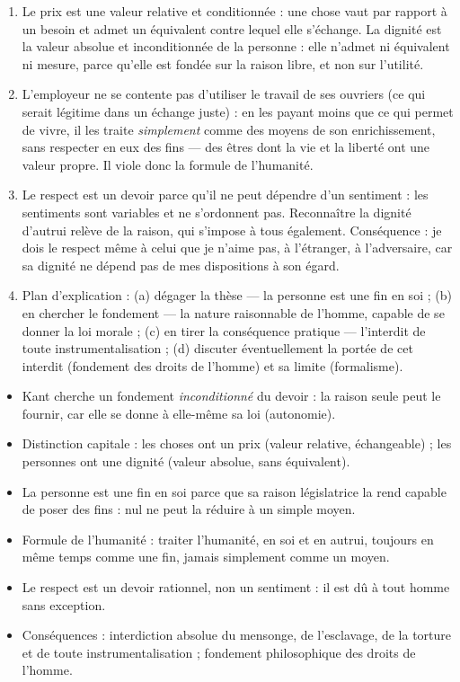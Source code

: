 \documentclass[11pt]{article}
\newcommand{\cle}[1]{{\popxbold\color{popdark}#1}}
\begin{document}
\begin{corrige}
\begin{enumerate}
\item Le prix est une valeur relative et conditionnée : une chose vaut par rapport à un besoin et admet un équivalent contre lequel elle s'échange. La dignité est la valeur absolue et inconditionnée de la personne : elle n'admet ni équivalent ni mesure, parce qu'elle est fondée sur la raison libre, et non sur l'utilité.
\item L'employeur ne se contente pas d'utiliser le travail de ses ouvriers (ce qui serait légitime dans un échange juste) : en les payant moins que ce qui permet de vivre, il les traite \emph{simplement} comme des moyens de son enrichissement, sans respecter en eux des fins — des êtres dont la vie et la liberté ont une valeur propre. Il viole donc la formule de l'humanité.
\item Le respect est un devoir parce qu'il ne peut dépendre d'un sentiment : les sentiments sont variables et ne s'ordonnent pas. Reconnaître la dignité d'autrui relève de la raison, qui s'impose à tous également. Conséquence : je dois le respect même à celui que je n'aime pas, à l'étranger, à l'adversaire, car sa dignité ne dépend pas de mes dispositions à son égard.
\item Plan d'explication : (a) dégager la thèse — la personne est une fin en soi ; (b) en chercher le fondement — la nature raisonnable de l'homme, capable de se donner la loi morale ; (c) en tirer la conséquence pratique — l'interdit de toute instrumentalisation ; (d) discuter éventuellement la portée de cet interdit (fondement des droits de l'homme) et sa limite (formalisme).
\end{enumerate}
\end{corrige}

\begin{aretenir}
\begin{itemize}
\item Kant cherche un fondement \emph{inconditionné} du devoir : la raison seule peut le fournir, car elle se donne à elle-même sa loi (\cle{autonomie}).
\item Distinction capitale : les choses ont un \cle{prix} (valeur relative, échangeable) ; les personnes ont une \cle{dignité} (valeur absolue, sans équivalent).
\item La personne est une \cle{fin en soi} parce que sa raison législatrice la rend capable de poser des fins : nul ne peut la réduire à un simple moyen.
\item Formule de l'humanité : traiter l'humanité, en soi et en autrui, toujours en même temps comme une fin, jamais simplement comme un moyen.
\item Le \cle{respect} est un devoir rationnel, non un sentiment : il est dû à tout homme sans exception.
\item Conséquences : interdiction absolue du mensonge, de l'esclavage, de la torture et de toute instrumentalisation ; fondement philosophique des droits de l'homme.
\end{itemize}
\end{aretenir}
\end{document}
